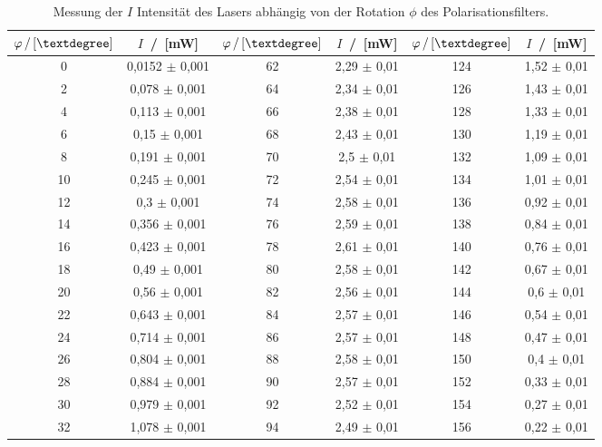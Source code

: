 \begin{table}[H]
    \label{tab:pol}
    \centering
    \caption{Messung der $I$ Intensität des Lasers abhängig von der Rotation $\phi$ des Polarisationsfilters.}
    \begin{tabular}{cc|cc|cc}
    \toprule
    $\varphi \,/\, [\textdegree]$ &
    $I$ \,/\, [\unit{\milli\watt}]&
    $\varphi \,/\, [\textdegree]$ &
    $I$ \,/\, [\unit{\milli\watt}]&
    $\varphi \,/\, [\textdegree]$ &
    $I$  \,/\, [\unit{\milli\watt}]\\
    \midrule
    0  & 0,0152 $\pm$ 0,001 & 62  & 2,29 $\pm$  0,01 & 124 & 1,52  $\pm$ 0,01 \\
    2  & 0,078  $\pm$ 0,001 & 64  & 2,34 $\pm$  0,01 & 126 & 1,43  $\pm$ 0,01 \\
    4  & 0,113  $\pm$ 0,001 & 66  & 2,38 $\pm$  0,01 & 128 & 1,33  $\pm$ 0,01 \\
    6  & 0,15   $\pm$ 0,001 & 68  & 2,43 $\pm$  0,01 & 130 & 1,19  $\pm$ 0,01 \\
    8  & 0,191  $\pm$ 0,001 & 70  & 2,5  $\pm$  0,01 & 132 & 1,09  $\pm$ 0,01 \\
    10 & 0,245 $\pm$  0,001 & 72  & 2,54 $\pm$  0,01 & 134 & 1,01  $\pm$ 0,01 \\
    12 & 0,3   $\pm$  0,001 & 74  & 2,58 $\pm$  0,01 & 136 & 0,92  $\pm$ 0,01 \\
    14 & 0,356 $\pm$  0,001 & 76  & 2,59 $\pm$  0,01 & 138 & 0,84  $\pm$ 0,01 \\
    16 & 0,423 $\pm$  0,001 & 78  & 2,61 $\pm$  0,01 & 140 & 0,76  $\pm$ 0,01 \\
    18 & 0,49  $\pm$  0,001 & 80  & 2,58 $\pm$  0,01 & 142 & 0,67  $\pm$ 0,01 \\
    20 & 0,56  $\pm$  0,001 & 82  & 2,56 $\pm$  0,01 & 144 & 0,6   $\pm$ 0,01 \\
    22 & 0,643 $\pm$  0,001 & 84  & 2,57 $\pm$  0,01 & 146 & 0,54  $\pm$ 0,01 \\
    24 & 0,714 $\pm$  0,001 & 86  & 2,57 $\pm$  0,01 & 148 & 0,47  $\pm$ 0,01 \\
    26 & 0,804 $\pm$  0,001 & 88  & 2,58 $\pm$  0,01 & 150 & 0,4   $\pm$ 0,01 \\
    28 & 0,884 $\pm$  0,001 & 90  & 2,57 $\pm$  0,01 & 152 & 0,33  $\pm$ 0,01 \\
    30 & 0,979 $\pm$  0,001 & 92  & 2,52 $\pm$  0,01 & 154 & 0,27  $\pm$ 0,01 \\
    32 & 1,078 $\pm$  0,001 & 94  & 2,49 $\pm$  0,01 & 156 & 0,22  $\pm$ 0,01 \\

\end{tabular}
\end{table}
